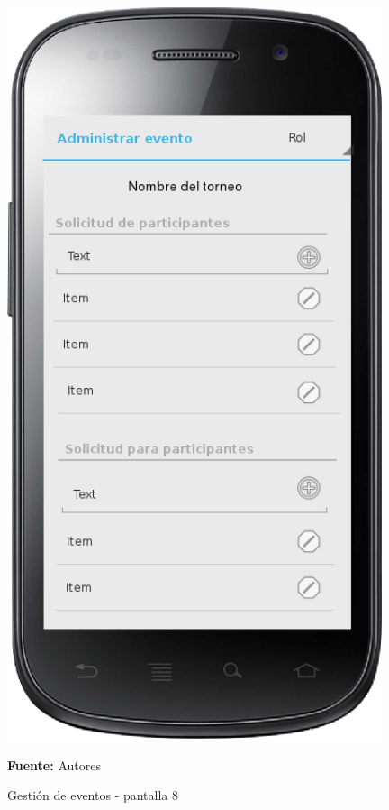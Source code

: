 \begin{figure}[!htb]
  \begin{center}
    \includegraphics[width=11cm]{./imagenes/UI/Eventos/gestion_eventos_8.png}
    \caption{Gestión de eventos - pantalla 8}
    \label{fig:gestion_eventos_8}
    \textbf{Fuente:}  Autores
  \end{center}
\end{figure}


